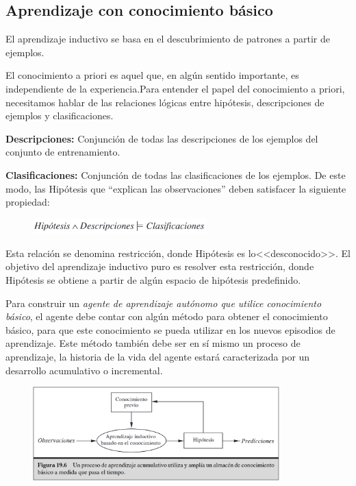 \documentclass[12 pt, a4paper]{article}
\begin{document}
	 	\subsection{Aprendizaje con conocimiento básico}
	 		El aprendizaje inductivo se basa en el descubrimiento de patrones a partir de ejemplos.
			
			El conocimiento a priori es aquel que, en algún sentido importante, es independiente de la experiencia.Para entender el papel del conocimiento a priori, necesitamos hablar de las relaciones lógicas entre hipótesis, descripciones de ejemplos y clasificaciones.
			
			\textbf{Descripciones:} Conjunción de todas las descripciones de los ejemplos del conjunto de entrenamiento.
			
			\textbf{Clasificaciones:} Conjunción de todas las clasificaciones de los ejemplos.
De este modo, las Hipótesis que ``explican las observaciones'' deben satisfacer la siguiente propiedad:
				
				\begin{figure}[h]
					\centering
					\includegraphics[width=0.6\textwidth]{./section2/fig1.png}
				\end{figure}
			
			Esta relación se denomina restricción, donde Hipótesis es lo<<desconocido>>.  El objetivo del aprendizaje inductivo puro es resolver esta restricción, donde Hipótesis se obtiene a partir de algún espacio de hipótesis predefinido.
			
			Para construir un \emph{agente de aprendizaje autónomo que utilice conocimiento básico}, el agente debe contar con algún método para obtener el conocimiento básico, para que este conocimiento se pueda utilizar en los nuevos episodios de aprendizaje. Este método también debe ser en sí mismo un proceso de aprendizaje, la historia de la vida del agente estará caracterizada por un desarrollo acumulativo o incremental.
				\begin{figure}[h]
					\centering
					\includegraphics[width=0.85\textwidth]{./section2/fig2.png}
				\end{figure}
\end{document}
